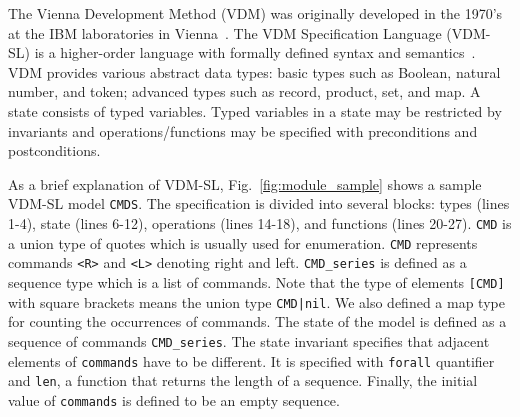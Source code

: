 
The Vienna Development Method (VDM) was originally developed in the 1970's at the IBM laboratories in Vienna~\cite{DBLP:conf/fm/1978}. The VDM Specification Language (VDM-SL) is a higher-order language with formally defined syntax and semantics~\cite{Prehn:1991:LNCS551,Larsen1995585}. VDM provides various abstract data types: basic types such as Boolean, natural number, and token; advanced types such as record, product, set, and map. A state consists of typed variables. Typed variables in a state may be restricted by invariants and operations/functions may be specified with preconditions and postconditions.

As a brief explanation of VDM-SL, Fig.~\ref{fig:module_sample} shows a sample VDM-SL model {\tt CMDS}. The specification is divided into several blocks: types (lines 1-4), state (lines 6-12), operations (lines 14-18), and functions (lines 20-27). {\tt CMD} is a union type of quotes which is usually used for enumeration. {\tt CMD} represents commands {\tt <R>} and {\tt <L>} denoting right and left. {\tt CMD\_series} is defined as a sequence type which is a list of commands. Note that the type of elements {\tt [CMD]} with square brackets means the union type {\tt CMD|nil}. We also defined a map type for counting the occurrences of commands. The state of the model is defined as a sequence of commands {\tt CMD\_series}. The state invariant specifies that adjacent elements of {\tt commands} have to be different. It is specified with {\tt forall} quantifier and {\tt len}, a function that returns the length of a sequence. Finally, the initial value of \texttt{commands} is defined to be an empty sequence.


